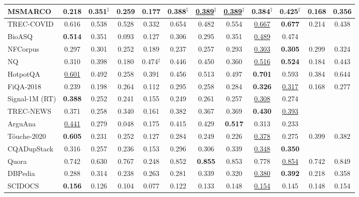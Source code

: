 \begin{table}[t!]
{\begin{tabular}{l | c | c | c c c c c | c c | c c }
   MSMARCO & 0.218 & 0.351$^\ddagger$ & 0.259 & 0.177 & 0.388$^\ddagger$ & \underline{0.389}$^\ddagger$ & \underline{0.389}$^\ddagger$ & 0.384$^\ddagger$ & \textbf{0.425}$^\ddagger$ & 0.168 & 0.356\\  \midrule \midrule
   TREC-COVID    & 0.616 & 0.538 & 0.528 & 0.332 & 0.654 & 0.482 & 0.554 & \underline{0.667} & \textbf{0.677} & 0.214 & 0.438 \\
   BioASQ        & \textbf{0.514} & 0.351 & 0.093 & 0.127 & 0.306 & 0.295 & 0.351 & \underline{0.489} & 0.474 \\
   NFCorpus      & 0.297 & 0.301 & 0.252 & 0.189 & 0.237 & 0.257 & 0.293 & \underline{0.303} & \textbf{0.305} &  0.299 & \colorbox{blue!30}{0.324}\\ \midrule
   NQ            & 0.310 & 0.398 & 0.180 & 0.474$^\ddagger$ & 0.446 & 0.450 & 0.360 & \underline{0.516} & \textbf{0.524} &  0.184 & 0.443 \\ 
   HotpotQA      & \underline{0.601} & 0.492 & 0.258 & 0.391 & 0.456 & 0.513 & 0.497 & \textbf{0.701} & 0.593 & 0.384 & \colorbox{green!30}{0.644} \\ 
   FiQA-2018     & 0.239 & 0.198 & 0.264 & 0.112 & 0.295 & 0.258 & 0.284 & \textbf{0.326} & \underline{0.317} & 0.168 & 0.277\\ \midrule
   Signal-1M (RT)& \textbf{0.388} & 0.252 & 0.241 & 0.155 & 0.249 & 0.261 & 0.257 & \underline{0.308} & 0.274 \\ \midrule
   TREC-NEWS     & 0.371 & 0.258 & 0.340 & 0.161 & 0.382 & 0.367 & 0.369 & \textbf{0.430} & \underline{0.393} \\ \midrule
   ArguAna       & \underline{0.441} & 0.279 & 0.048 & 0.175 & 0.415 & 0.429 & \textbf{0.517} & 0.313 & 0.233 \\  
   T\'ouche-2020 & \textbf{0.605} & 0.231 & 0.252 & 0.127 & 0.284 & 0.249 & 0.226 & \underline{0.378} & 0.275 & 0.399 & 0.382\\ \midrule 
   CQADupStack   & 0.316 & 0.257 & 0.236 & 0.153 & 0.296 & 0.306 & 0.339 & \underline{0.348} & \textbf{0.350} \\
   Quora         & 0.742 & 0.630 & 0.767 & 0.248 & 0.852 & \textbf{0.855} & 0.853 & 0.778 & \underline{0.854} & 0.742 & 0.849 \\ \midrule
   DBPedia       & 0.288 & 0.314 & 0.238 & 0.263 & 0.281 & 0.339 & 0.320 & \underline{0.380} & \textbf{0.392} & 0.218 & \colorbox{green!30}{0.358} \\ \midrule
   SCIDOCS       & \textbf{0.156} & 0.126 & 0.104 & 0.077 & 0.122 & 0.133 & 0.148 & \underline{0.154} & 0.145 & 0.148 & 0.154 \\ \midrule

\end{tabular}}
\end{table}
